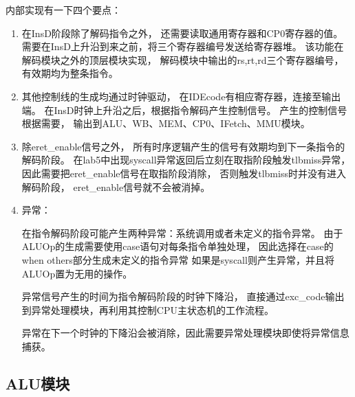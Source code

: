             内部实现有一下四个要点：%
            \begin{enumerate}
            \item
            在InsD阶段除了解码指令之外，%
            还需要读取通用寄存器和CP0寄存器的值。%
            需要在InsD上升沿到来之前，将三个寄存器编号发送给寄存器堆。%
            该功能在解码模块之外的顶层模块实现，%
            解码模块中输出的rs,rt,rd三个寄存器编号，%
            有效期均为整条指令。
            \item
            其他控制线的生成均通过时钟驱动，%
            在IDEcode有相应寄存器，连接至输出端。%
            在InsD时钟上升沿之后，根据指令解码产生控制信号。%
            产生的控制信号根据需要，%
            输出到ALU、WB、MEM、CP0、IFetch、MMU模块。
            \item
            除eret\_enable信号之外，%
            所有时序逻辑产生的信号有效期均到下一条指令的解码阶段。%
            在lab5中出现syscall异常返回后立刻在取指阶段触发tlbmiss异常，%
            因此需要把eret\_enable信号在取指阶段消除，%
            否则触发tlbmiss时并没有进入解码阶段，%
            eret\_enable信号就不会被消掉。
            \item
            异常：

            在指令解码阶段可能产生两种异常：系统调用或者未定义的指令异常。%
            由于ALUOp的生成需要使用case语句对每条指令单独处理，%
            因此选择在case的when others部分生成未定义的指令异常%
            如果是syscall则产生异常，并且将ALUOp置为无用的操作。%

            异常信号产生的时间为指令解码阶段的时钟下降沿，%
            直接通过exc\_code输出到异常处理模块，再利用其控制CPU主状态机的工作流程。

            异常在下一个时钟的下降沿会被消除，因此需要异常处理模块即使将异常信息捕获。

            \end{enumerate}

    \subsection{ALU模块}
